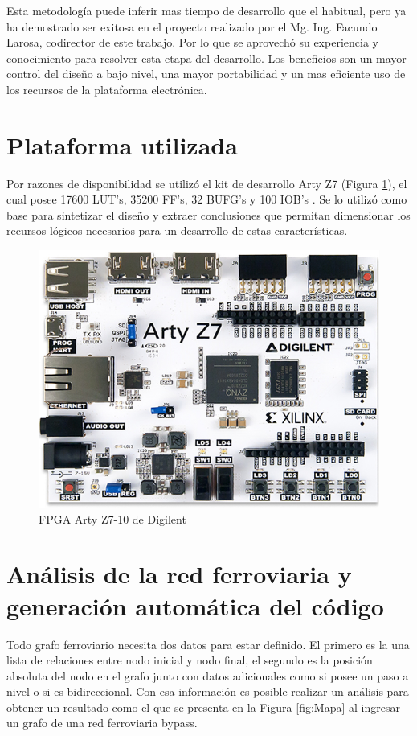 	Esta metodología puede inferir mas tiempo de desarrollo que el habitual, pero ya ha demostrado ser exitosa en el proyecto realizado por el Mg. Ing. Facundo Larosa, codirector de este trabajo. Por lo que se aprovechó su experiencia y conocimiento para resolver esta etapa del desarrollo. Los beneficios son un mayor control del diseño a bajo nivel, una mayor portabilidad y un mas eficiente uso de los recursos de la plataforma electrónica.

\section{Plataforma utilizada}

	Por razones de disponibilidad se utilizó el kit de desarrollo Arty Z7  (Figura \ref{fig:FPGA}), el cual posee 17600 LUT’s, 35200 FF’s, 32 BUFG’s y 100 IOB’s \cite{cite28}. Se lo utilizó como base para sintetizar el diseño y extraer conclusiones que permitan dimensionar los recursos lógicos necesarios para un desarrollo de estas características.
	
	\begin{figure}[h]
	\centering
		\includegraphics[scale=.4]{./Figures/FPGA}
		\caption{FPGA Arty Z7-10 de Digilent}
	\label{fig:FPGA}	
	\end{figure}

\section{Análisis de la red ferroviaria y generación automática del código}

	Todo grafo ferroviario necesita dos datos para estar definido. El primero es la una lista de relaciones entre nodo inicial y nodo final, el segundo es la posición absoluta del nodo en el grafo junto con datos adicionales como si posee un paso a nivel o si es bidireccional. Con esa información es posible realizar un análisis para obtener un resultado como el que se presenta en la Figura \ref{fig:Mapa} al ingresar un grafo de una red ferroviaria bypass.	

